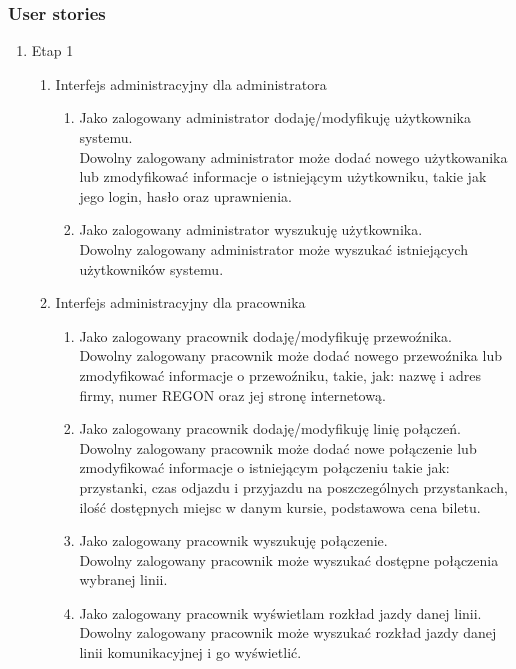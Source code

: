 \documentclass[10pt,a4paper]{article}
\begin{document}
\newpage
\subsubsection{User stories}
\begin{enumerate}
	\bfseries
	\item Etap 1
	\begin{enumerate}[label*=\arabic*.]
	\item Interfejs administracyjny dla administratora
		\begin{enumerate}[label*=\arabic*.]
			\mdseries
			\item Jako zalogowany administrator dodaję/modyfikuję użytkownika systemu.\\
				Dowolny zalogowany administrator może dodać nowego użytkowanika lub zmodyfikować informacje o istniejącym użytkowniku, takie jak jego login, hasło oraz uprawnienia.
			\item Jako zalogowany administrator wyszukuję użytkownika. \\
			    Dowolny zalogowany administrator może wyszukać istniejących użytkowników systemu.
		\end{enumerate}
		\item Interfejs administracyjny dla pracownika
		\begin{enumerate}[label*=\arabic*.]
			\mdseries
			\item Jako zalogowany pracownik dodaję/modyfikuję przewoźnika. \\
				Dowolny zalogowany pracownik może dodać nowego przewoźnika lub zmodyfikować informacje o przewoźniku, takie, jak: nazwę i adres firmy, numer REGON oraz jej stronę internetową.
			\item Jako zalogowany pracownik dodaję/modyfikuję linię połączeń. \\
				Dowolny zalogowany pracownik może dodać nowe połączenie lub zmodyfikować informacje o istniejącym połączeniu takie jak: przystanki, czas odjazdu i przyjazdu na poszczególnych przystankach, ilość dostępnych miejsc w danym kursie, podstawowa cena biletu.
			\item Jako zalogowany pracownik wyszukuję połączenie. \\
			    Dowolny zalogowany pracownik może wyszukać dostępne połączenia wybranej linii.
		 	\item Jako zalogowany pracownik wyświetlam rozkład jazdy danej linii. \\
			    Dowolny zalogowany pracownik może wyszukać rozkład jazdy danej linii
			    komunikacyjnej i go wyświetlić.

\end{enumerate}
\end{enumerate}
\end{enumerate}
\end{document}

